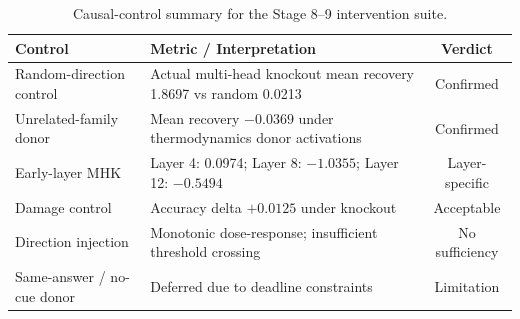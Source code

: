 \begin{table}[t]
\centering
\caption{Causal-control summary for the Stage 8--9 intervention suite.}
\label{tab:causal-controls}
\begin{tabular}{lp{9cm}c}
\toprule
Control & Metric / Interpretation & Verdict \\
\midrule
Random-direction control & Actual multi-head knockout mean recovery 1.8697 vs random 0.0213 & Confirmed \\
Unrelated-family donor & Mean recovery $-0.0369$ under thermodynamics donor activations & Confirmed \\
Early-layer MHK & Layer 4: 0.0974; Layer 8: $-1.0355$; Layer 12: $-0.5494$ & Layer-specific \\
Damage control & Accuracy delta $+0.0125$ under knockout & Acceptable \\
Direction injection & Monotonic dose-response; insufficient threshold crossing & No sufficiency \\
Same-answer / no-cue donor & Deferred due to deadline constraints & Limitation \\
\bottomrule
\end{tabular}
\end{table}
